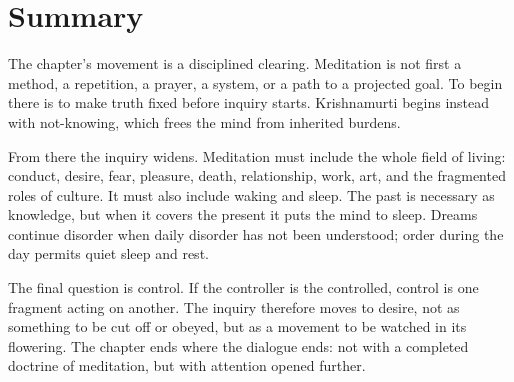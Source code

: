 \section{Summary}

The chapter's movement is a disciplined clearing. Meditation is not first a method, a repetition, a prayer, a system, or a path to a projected goal. To begin there is to make truth fixed before inquiry starts. Krishnamurti begins instead with not-knowing, which frees the mind from inherited burdens.

From there the inquiry widens. Meditation must include the whole field of living: conduct, desire, fear, pleasure, death, relationship, work, art, and the fragmented roles of culture. It must also include waking and sleep. The past is necessary as knowledge, but when it covers the present it puts the mind to sleep. Dreams continue disorder when daily disorder has not been understood; order during the day permits quiet sleep and rest.

The final question is control. If the controller is the controlled, control is one fragment acting on another. The inquiry therefore moves to desire, not as something to be cut off or obeyed, but as a movement to be watched in its flowering. The chapter ends where the dialogue ends: not with a completed doctrine of meditation, but with attention opened further.